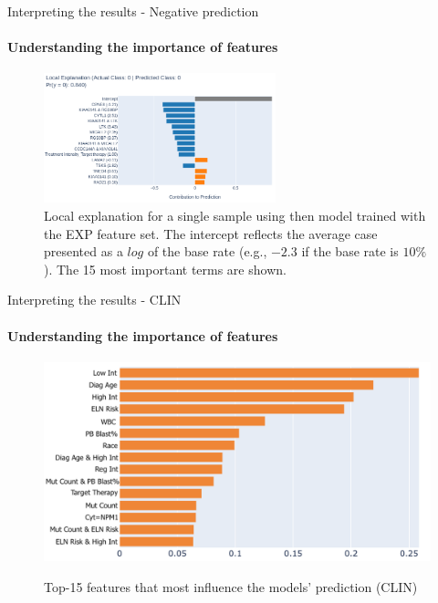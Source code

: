 \begin{frame}{Interpreting the results - Negative prediction}
\framesubtitle{Understanding the importance of features}


\begin{figure}[!htb]
    \begin{center}
        \includegraphics[width=0.6\textwidth]{beamerthemesrc/figs/TN_prediction.png}
    \end{center}
    \caption{\tiny Local explanation for a single sample using then model trained with the EXP feature set. The intercept reflects the average case presented as a $log$ of the base rate (e.g., $-2.3$ if the base rate is $10\%$). The 15 most important terms are shown.}
    \label{fig:prediction-interpretability}
\end{figure}

\end{frame}






\begin{frame}{Interpreting the results - CLIN}
\framesubtitle{Understanding the importance of features}
    
\begin{figure}[!htbp]
    \centering
         \includegraphics[width=.65\textwidth]{beamerthemesrc/figs/feat_importance_CLIN.png}
         \label{fig:feat_imp_CLIN}
    \caption{Top-15 features that most influence the models' prediction (CLIN)}
    \label{fig:feature-importance}
    \end{figure}

\end{frame}


